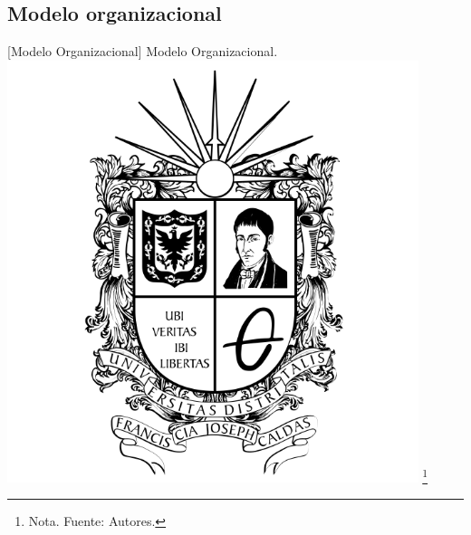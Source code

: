 \subsection{Modelo organizacional}
\vspace{2mm}
        \begin{minipage}{0.9\textwidth}
        \centering
        [{Modelo Organizacional}]{ Modelo Organizacional.  }
        \label{ModeloOrganizacional}
         \includegraphics[width=0.9\textwidth]{Content/Images/Escudo_UD.png}
        \footnote{Nota. \textup{Fuente: Autores.}}
\end{minipage}